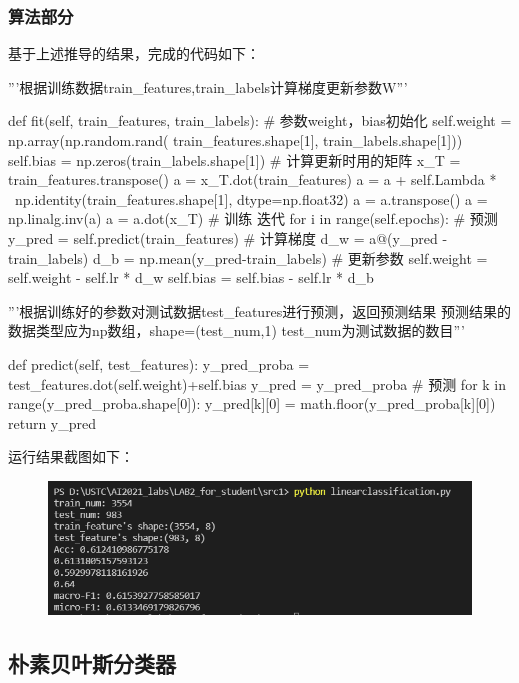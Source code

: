 \documentclass{ctexart}
\begin{document}
\subsubsection{\hei 算法部分}
基于上述推导的结果，完成的代码如下：
\begin{python}
    '''根据训练数据train_features,train_labels计算梯度更新参数W'''

    def fit(self, train_features, train_labels):
    # 参数weight，bias初始化
    self.weight = np.array(np.random.rand(
    train_features.shape[1], train_labels.shape[1]))
    self.bias = np.zeros(train_labels.shape[1])
    # 计算更新时用的矩阵
    x_T = train_features.transpose()
    a = x_T.dot(train_features)
    a = a + self.Lambda * \
    np.identity(train_features.shape[1], dtype=np.float32)
    a = a.transpose()
    a = np.linalg.inv(a)
    a = a.dot(x_T)
    # 训练 迭代
    for i in range(self.epochs):
    # 预测
    y_pred = self.predict(train_features)
    # 计算梯度
    d_w = a@(y_pred - train_labels)
    d_b = np.mean(y_pred-train_labels)
    # 更新参数
    self.weight = self.weight - self.lr * d_w
    self.bias = self.bias - self.lr * d_b

    '''根据训练好的参数对测试数据test_features进行预测，返回预测结果
    预测结果的数据类型应为np数组，shape=(test_num,1) test_num为测试数据的数目'''

    def predict(self, test_features):
    y_pred_proba = test_features.dot(self.weight)+self.bias
    y_pred = y_pred_proba
    # 预测
    for k in range(y_pred_proba.shape[0]):
    y_pred[k][0] = math.floor(y_pred_proba[k][0])
    return y_pred
\end{python}
\par 运行结果截图如下：
\begin{figure}[htbp]
    \centering
    \includegraphics[scale=0.5]{lc.png}

\end{figure}
\subsection{\hei 朴素贝叶斯分类器}
\end{document}
